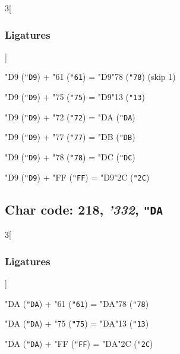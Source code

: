 \documentclass{article}
\newlength{\maxcharwidth}
\begin{document}
\begin{multicols}{3}[\subsubsection{Ligatures}]

{\testfont\char"D9\noboundary} ({\tt"D9}) + {\testfont\char"61\noboundary} ({\tt"61}) = {\testfont\char"D9\noboundary}{\testfont\char"78\noboundary} ({\tt"78})  (skip 1)

{\testfont\char"D9\noboundary} ({\tt"D9}) + {\testfont\char"75\noboundary} ({\tt"75}) = {\testfont\char"D9\noboundary}{\testfont\char"13\noboundary} ({\tt"13}) 

{\testfont\char"D9\noboundary} ({\tt"D9}) + {\testfont\char"72\noboundary} ({\tt"72}) = {\testfont\char"DA\noboundary} ({\tt"DA}) 

{\testfont\char"D9\noboundary} ({\tt"D9}) + {\testfont\char"77\noboundary} ({\tt"77}) = {\testfont\char"DB\noboundary} ({\tt"DB}) 

{\testfont\char"D9\noboundary} ({\tt"D9}) + {\testfont\char"78\noboundary} ({\tt"78}) = {\testfont\char"DC\noboundary} ({\tt"DC}) 

{\testfont\char"D9\noboundary} ({\tt"D9}) + {\testfont\char"FF\noboundary} ({\tt"FF}) = {\testfont\char"D9\noboundary}{\testfont\char"2C\noboundary} ({\tt"2C}) 

\end{multicols}

\subsection{Char code: 218, {\it'332}, {\tt"DA}}
\label{char_218}


\begin{multicols}{3}[\subsubsection{Ligatures}]

{\testfont\char"DA\noboundary} ({\tt"DA}) + {\testfont\char"61\noboundary} ({\tt"61}) = {\testfont\char"DA\noboundary}{\testfont\char"78\noboundary} ({\tt"78}) 

{\testfont\char"DA\noboundary} ({\tt"DA}) + {\testfont\char"75\noboundary} ({\tt"75}) = {\testfont\char"DA\noboundary}{\testfont\char"13\noboundary} ({\tt"13}) 

{\testfont\char"DA\noboundary} ({\tt"DA}) + {\testfont\char"FF\noboundary} ({\tt"FF}) = {\testfont\char"DA\noboundary}{\testfont\char"2C\noboundary} ({\tt"2C}) 

\end{multicols}
\end{document}
